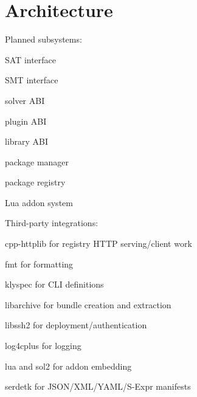 \chapter{Architecture }
\label{md__2home_2chubakpdp11_2sattyre_2docs_2architecture}
\label{md__2home_2chubakpdp11_2sattyre_2docs_2architecture_autotoc_md0}%
%


Planned subsystems:\+


\begin{DoxyItemize}
\item SAT interface
\item SMT interface
\item solver ABI
\item plugin ABI
\item library ABI
\item package manager
\item package registry
\item Lua addon system
\end{DoxyItemize}

Third-\/party integrations:\+


\begin{DoxyItemize}
\item {\ttfamily cpp-\/httplib} for registry HTTP serving/\+client work
\item {\ttfamily fmt} for formatting
\item {\ttfamily klyspec} for CLI definitions
\item {\ttfamily libarchive} for bundle creation and extraction
\item {\ttfamily libssh2} for deployment/\+authentication
\item {\ttfamily log4cplus} for logging
\item {\ttfamily lua} and {\ttfamily sol2} for addon embedding
\item {\ttfamily serdetk} for JSON/\+\+XML/\+\+YAML/\+\+S-\/\+Expr manifests 
\end{DoxyItemize}